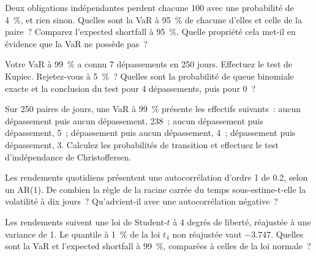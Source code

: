 \begin{question}\label{iq:iv2:risk-validation-and-regulation:11}
Deux obligations indépendantes perdent chacune 100 avec une probabilité de 4~\%, et rien sinon. Quelles sont la VaR à 95~\% de chacune d'elles et celle de la paire~? Comparez l'expected shortfall à 95~\%. Quelle propriété cela met-il en évidence que la VaR ne possède pas~?
\end{question}

\begin{question}\label{iq:iv2:risk-validation-and-regulation:12}
Votre VaR à 99~\% a connu 7 dépassements en 250 jours. Effectuez le test de Kupiec. Rejetez-vous à 5~\%~? Quelles sont la probabilité de queue binomiale exacte et la conclusion du test pour 4 dépassements, puis pour 0~?
\end{question}

\begin{question}\label{iq:iv2:risk-validation-and-regulation:13}
Sur 250 paires de jours, une VaR à 99~\% présente les effectifs suivants~: aucun dépassement puis aucun dépassement, 238~; aucun dépassement puis dépassement, 5~; dépassement puis aucun dépassement, 4~; dépassement puis dépassement, 3. Calculez les probabilités de transition et effectuez le test d'indépendance de Christoffersen.
\end{question}

\begin{question}\label{iq:iv2:risk-validation-and-regulation:14}
Les rendements quotidiens présentent une autocorrélation d'ordre 1 de 0.2, selon un AR(1). De combien la règle de la racine carrée du temps sous-estime-t-elle la volatilité à dix jours~? Qu'advient-il avec une autocorrélation négative~?
\end{question}

\begin{question}\label{iq:iv2:risk-validation-and-regulation:15}
Les rendements suivent une loi de Student-$t$ à 4 degrés de liberté, réajustée à une variance de 1. Le quantile à 1~\% de la loi $t_4$ non réajustée vaut $-3.747$. Quelles sont la VaR et l'expected shortfall à 99~\%, comparées à celles de la loi normale~?
\end{question}

